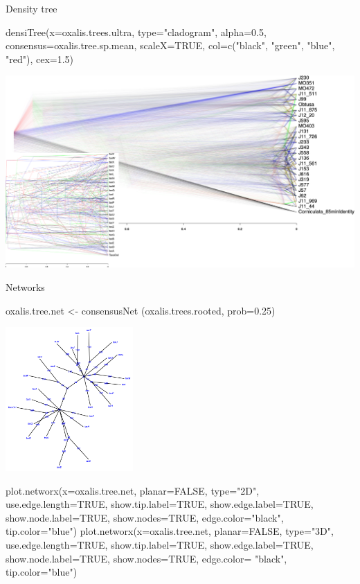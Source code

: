 \documentclass[compress, ucs, xelatex, 11pt, xcolor=svgnames,
  hyperref={
    bookmarks=true,
    unicode=true,
    colorlinks=true,
    pdftitle={Molecular data in R},
    plainpages=false,
    pdfauthor={Vojtech Zeisek},
    pdfsubject={Course about phylogeny and evolution in R},
    pdfcreator={XeLaTeX},
    pdfkeywords={R, evolution, phylogeny, molecular data},
    linkcolor=Tomato,
    anchorcolor=SaddleBrown,
    citecolor=Goldenrod,
    filecolor=DarkMagenta,
    menucolor=Sienna,
    urlcolor=DarkTurquoise,
    pdftex},
  url={hyphens, lowtilde} %
  ]{beamer}
\begin{document}
\begin{frame}[fragile]{Density tree}
  \begin{spluscode}
    densiTree(x=oxalis.trees.ultra, type="cladogram", alpha=0.5,
      consensus=oxalis.tree.sp.mean, scaleX=TRUE, col=c("black",
      "green", "blue", "red"), cex=1.5)
  \end{spluscode}
\begin{center}
  \includegraphics[width=\textwidth-1.5cm]{oxalis_density_good.png}
\end{center}
\end{frame}

\begin{frame}[fragile]{Networks}
\begin{multicols}{2}
  \begin{spluscode}
    oxalis.tree.net <- consensusNet
      (oxalis.trees.rooted, prob=0.25)
  \end{spluscode}

  \includegraphics[height=5.5cm]{oxalis-net.png}
  \columnbreak
  \begin{spluscode}
    plot.networx(x=oxalis.tree.net,
      planar=FALSE, type="2D",
      use.edge.length=TRUE,
      show.tip.label=TRUE,
      show.edge.label=TRUE,
      show.node.label=TRUE,
      show.nodes=TRUE,
      edge.color="black",
      tip.color="blue")
    plot.networx(x=oxalis.tree.net,
      planar=FALSE, type="3D",
      use.edge.length=TRUE,
      show.tip.label=TRUE,
      show.edge.label=TRUE,
      show.node.label=TRUE,
      show.nodes=TRUE, edge.color=
      "black", tip.color="blue")
  \end{spluscode}
\end{multicols}
\end{frame}
\end{document}
